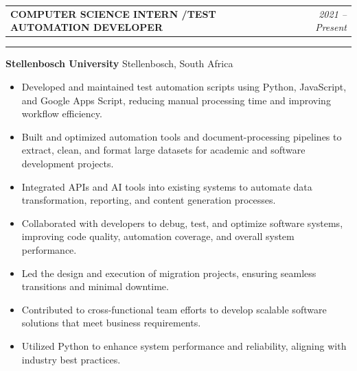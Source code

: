 \documentclass[11pt, a4paper]{article}
\begin{document}
\vspace{6pt}
\noindent
\begin{tabularx}{\linewidth}{Xr}
  \textcolor{DarkTxt}{\textbf{\large COMPUTER SCIENCE INTERN /TEST AUTOMATION DEVELOPER}} &
  \textcolor{LiteTxt}{\textit{2021 -- Present}} \\
\end{tabularx}%
{\color{DKGreen}\rule{\linewidth}{0.8pt}}%
\vspace{2pt}
\noindent\textcolor{MDGreen}{\textbf{Stellenbosch University}}\;%
\textcolor{LiteTxt}{\bullet\; Stellenbosch, South Africa}
\vspace{3pt}
\begin{itemize}
  \item\textcolor{MidTxt}{Developed and maintained test automation scripts using Python, JavaScript, and Google Apps Script, reducing manual processing time and improving workflow efficiency.}
  \item\textcolor{MidTxt}{Built and optimized automation tools and document-processing pipelines to extract, clean, and format large datasets for academic and software development projects.}
  \item\textcolor{MidTxt}{Integrated APIs and AI tools into existing systems to automate data transformation, reporting, and content generation processes.}
  \item\textcolor{MidTxt}{Collaborated with developers to debug, test, and optimize software systems, improving code quality, automation coverage, and overall system performance.}
  \item\textcolor{MidTxt}{Led the design and execution of migration projects, ensuring seamless transitions and minimal downtime.}
  \item\textcolor{MidTxt}{Contributed to cross-functional team efforts to develop scalable software solutions that meet business requirements.}
  \item\textcolor{MidTxt}{Utilized Python to enhance system performance and reliability, aligning with industry best practices.}
\end{itemize}
\vspace{2pt}
\end{document}
